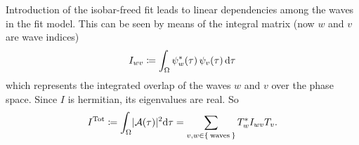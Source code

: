 Introduction of the isobar-freed fit leads to linear dependencies among the waves in the fit model.
This can be seen by means of the integral matrix (now $w$ and $v$ are wave indices)
\begin{equation}
    I_{wv} \coloneqq \int_\Omega \psi_w^*(\tau)\,\psi_v(\tau)\mathop{}\!\textup{d}\tau
\end{equation}
which represents the integrated overlap of the waves $w$ and $v$ over the phase space.
Since $I$ is hermitian, its eigenvalues are real.
So
\begin{equation}
    I^{\text{Tot}} \coloneqq \int_\Omega \lvert\mathcal{A}(\tau)\rvert^2\!\mathop{}\!\textup{d} \tau = \sum_{v,w \in \Set{\text{waves}}} T_w^* I_{wv} T_v.
\end{equation}
